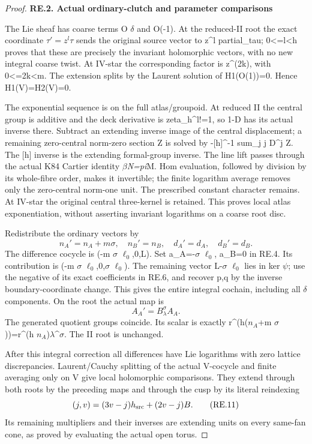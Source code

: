 \begin{proof}
\par

\medskip\noindent\textbf{RE.2. Actual ordinary-clutch and parameter comparisons}

\par\nobreak

The Lie sheaf has coarse terms O \(\delta\) and O(-1). At the reduced-II root
the exact coordinate \(\tau'=z^l\tau\) sends the original source vector to
z\^{}l partial\_tau\textquotesingle; 0\textless=l\textless h proves that these are precisely the invariant
holomorphic vectors, with no new integral coarse twist. At IV-star the
corresponding factor is z\^{}(2k), with 0\textless=2k\textless m. The extension splits by
the Laurent solution of H1(O(1))=0. Hence H1(V)=H2(V)=0.

The exponential sequence is on the full atlas/groupoid. At reduced II
the central group is additive and the deck derivative is zeta\_h\^{}l!=1,
so 1-D has its actual inverse there. Subtract an extending inverse image
of the central displacement; a remaining zero-central norm-zero section
Z is solved by -{[}h{]}\^{}-1 sum\_j j D\^{}j Z. The {[}h{]} inverse is the extending
formal-group inverse. The line lift passes through the actual K84
Cartier identity \(\beta\)\emph{N=pi}M. Hom evaluation, followed by division by
its whole-fibre order, makes it invertible; the finite logarithm average
removes only the zero-central norm-one unit. The prescribed constant
character remains. At IV-star the original central three-kernel is
retained. This proves local atlas exponentiation, without asserting
invariant logarithms on a coarse root disc.

Redistribute the ordinary vectors by
\[
n_A'=n_A+m\sigma,\quad n_B'=n_B,\quad d_A'=d_A,\quad d_B'=d_B.
\tag{RE.9}
\]
The difference cocycle is (-m \(\sigma\) \(\ell_0\),0,L). Set a\_A=-\(\sigma\) \(\ell_0\),
a\_B=0 in RE.4. Its contribution is (-m \(\sigma\) \(\ell_0\),0,\(\sigma\) \(\ell_0\)).
The remaining vector L-\(\sigma\) \(\ell_0\) lies in ker \(\psi\); use the negative
of its exact coefficients in RE.6, and recover p,q by the inverse
boundary-coordinate change. This gives the entire integral cochain,
including all \(\delta\) components. On the root the actual map is
\[
                         A_A'=B_\lambda^\sigma A_A.\tag{RE.10}
\]
The generated quotient groups coincide. Its scalar is exactly
r\^{}(h(\(n_A\)+m \(\sigma\)))=r\^{}(h \(n_A\))\(\lambda\)\^{}\(\sigma\). The II root is unchanged.

After this integral correction all differences have Lie logarithms
with zero lattice discrepancies. Laurent/Cauchy splitting of the actual
V-cocycle and finite averaging only on V give local holomorphic
comparisons. They extend through both roots by the preceding maps and
through the cusp by its literal reindexing
\[
                    (j,v)=(3v-j)h_{\rm src}+(2v-j)B.\tag{RE.11}
\]
Its remaining multipliers and their inverses are extending units on
every same-fan cone, as proved by evaluating the actual open torus.


\end{proof}
